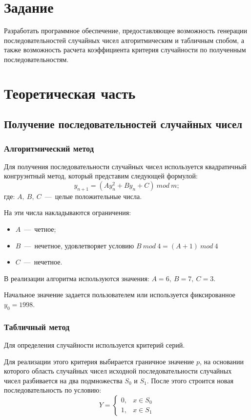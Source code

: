 \chapter{Задание}

Разработать программное обеспечение, предоставляющее возможность генерации последовательностей случайных чисел алгоритмическим и табличным спобом, а также возможность расчета коэффициента критерия случайности по полученным последовательностям.

\chapter{Теоретическая часть}
\section{Получение последовательностей случайных чисел}
\subsection{Алгоритмический метод}

Для получения последовательности случайных чисел используется квадратичный конгруэнтный метод, который представим следующей формулой:
\begin{equation}
    y_{n+1} = (Ay_n^2+By_n+C)\ mod\ m;
\end{equation}
где: $A,\ B,\ C$~---~целые положительные числа.

На эти числа накладываются ограничения:
\begin{itemize}
    \item $A$~---~четное;
    \item $B$~---~нечетное, удовлетворяет условию $B\ mod\ 4 = (A+1)\ mod\ 4$
    \item $C$~---~нечетное.
\end{itemize}

В реализации алгоритма используются значения: $A=6,\ B=7,\ C=3$.

Начальное значение задается пользователем или используется фиксированное $y_0 = 1998$.

\subsection{Табличный метод}

Для определения случайности используется критерий серий.

Для реализации этого критерия выбирается граничное значение $p$, на основании которого область случайных чисел исходной последовательности случайных чисел разбивается на два подмножества $S_0$ и $S_1$. После этого строится новая последовательность по условию:
\begin{equation} Y = 
    \begin{cases}
        0,  & x \in S_0\\
        1, & x \in S_1
    \end{cases}
\end{equation}

